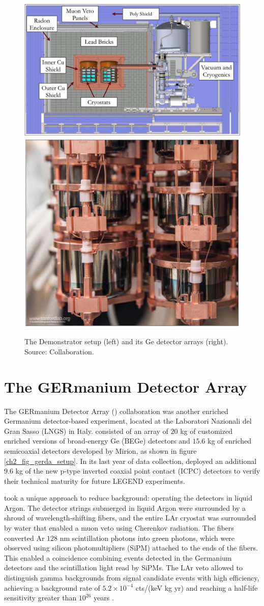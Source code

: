 \begin{figure}
  \centering
  \includegraphics[height=0.34\columnwidth]{ch2/figs/mjd_setup.pdf}
  \qquad
  \includegraphics[height=0.34\columnwidth]{ch2/figs/mjd_ppc_array.pdf}
  \caption{The {\MJ} Demonstrator setup (left) and its Ge detector arrays (right). Source: {\MJ} Collaboration.}
    \label{fig:mjd}
  \end{figure}
 
\section{The GERmanium Detector Array}
The GERmanium Detector Array ({\Gerda}) collaboration was another enriched Germanium detector-based experiment, located at the Laboratori Nazionali del Gran Sasso (LNGS) in Italy. {\Gerda} consisted of an array of $20$ kg of customized enriched versions of broad-energy Ge (BEGe) detectors and $15.6$ kg of enriched semicoaxial detectors developed by Mirion, as shown in figure \ref{ch2_fig_gerda_setup}. In its last year of data collection, {\Gerda} deployed an additional $9.6$ kg of the new p-type inverted coaxial point contact (ICPC) detectors to verify their technical maturity for future LEGEND experiments.

{\Gerda} took a unique approach to reduce background: operating the detectors in liquid Argon. The detector strings submerged in liquid Argon were surrounded by a shroud of wavelength-shifting fibers, and the entire LAr cryostat was surrounded by water that enabled a muon veto using Cherenkov radiation. The fibers converted Ar $128$ nm scintillation photons into green photons, which were observed using silicon photomultipliers (SiPM) attached to the ends of the fibers. This enabled a coincidence combining events detected in the Germanium detectors and the scintillation light read by SiPMs. The LAr veto allowed {\Gerda} to distinguish gamma backgrounds from {\onbb} signal candidate events with high efficiency, achieving a background rate of $5.2\times 10^{-4}$ cts/(keV kg yr) and reaching a half-life sensitivity greater than $10^{26}$ years \cite{GERDA_final}.

